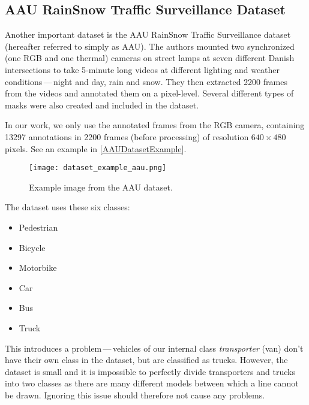 

\subsection{AAU RainSnow Traffic Surveillance Dataset}
\label{AAUDataset}

Another important dataset is the AAU RainSnow Traffic Surveillance
dataset~\cite{Bahnsen2019} (hereafter referred to simply as AAU). The authors
mounted two synchronized (one RGB and one thermal) cameras on street lamps at
seven different Danish intersections to take 5-minute long videos at different
lighting and weather conditions\,---\,night and day, rain and snow. They then
extracted \num{2200} frames from the videos and annotated them on a pixel-level.
Several different types of masks were also created and included in the dataset.

In our work, we only use the annotated frames from the RGB camera, containing
\num{13297} annotations in \num{2200} frames (before processing) of resolution
$640 \times 480$ pixels. See an example in \autoref{AAUDatasetExample}.

\begin{figure}[h]
    \centering
    \texttt{[image: dataset\_example\_aau.png]}
    \caption{Example image from the AAU dataset.}
    \label{AAUDatasetExample}
\end{figure}

The dataset uses these six classes:
\begin{itemize}
    \item Pedestrian
    \item Bicycle
    \item Motorbike
    \item Car
    \item Bus
    \item Truck
\end{itemize}
This introduces a problem\,---\,vehicles of our internal class \textit{transporter}
(van) don't have their own class in the dataset, but are classified as trucks.
However, the dataset is small and it is impossible to perfectly divide
transporters and trucks into two classes as there are many different models
between which a line cannot be drawn.  Ignoring this issue should therefore not
cause any problems.

